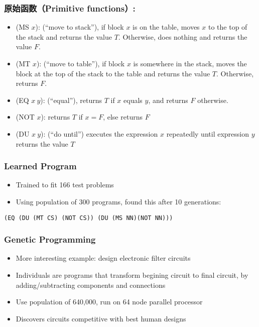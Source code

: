 \documentclass{beamer}
\begin{document}
\begin{frame}
\frametitle{原始函数（Primitive functions）:}
\label{sec-6-5}

\begin{itemize}
\item (MS $x$): (``move to stack''), if block $x$ is on the table, moves $x$ to the
    top of the stack and returns the value $T$.  Otherwise, does nothing and
    returns the value $F$.
\item (MT $x$): (``move to table''), if block $x$ is somewhere in the stack, moves
    the block at the top of the stack to the table and returns the value $T$.
    Otherwise, returns $F$.
\item (EQ $x \ y$): (``equal''), returns $T$ if $x$ equals $y$, and returns $F$
    otherwise.
\item (NOT $x$): returns $T$ if $x=F$, else returns $F$
\item (DU $x \ y$): (``do until'') executes the expression $x$ repeatedly
    until expression $y$ returns the value $T$
\end{itemize}
 
\end{frame}
\begin{frame}[fragile]
\frametitle{Learned Program}
\label{sec-6-6}


\begin{itemize}
\item Trained to fit 166 test problems
\item Using population of 300 programs, found this after 10 generations:
\end{itemize}

\begin{verbatim}
(EQ (DU (MT CS) (NOT CS)) (DU (MS NN)(NOT NN)))
\end{verbatim}
\end{frame}
\begin{frame}
\frametitle{Genetic Programming}
\label{sec-6-7}


\begin{itemize}
\item More interesting example: design electronic filter circuits
\item Individuals are programs that transform begining circuit to final
  circuit, by adding/subtracting components and connections
\item Use population of 640,000, run on 64 node parallel processor
\item Discovers circuits competitive with best human designs
\end{itemize}
\end{frame}
\end{document}
